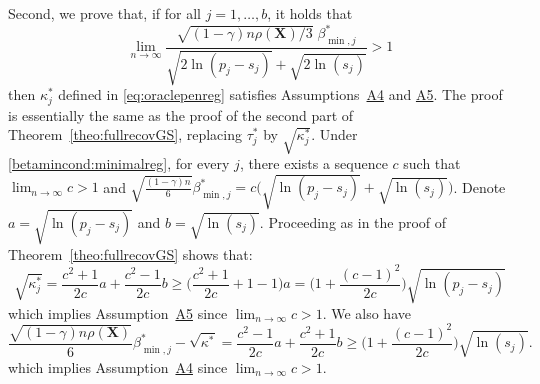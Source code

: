 \documentclass[
  12pt]{article}
\newcommand{\bX}{\mathbf{X}}
\begin{document}
Second, we prove that, if for all $j=1,\ldots,b$, it holds that
\begin{equation}\label{betamincond:minimalreg}
    \lim_{n\to \infty}\frac{\sqrt{(1-\gamma) n\rho(\bX)/3}\;\beta_{\min,j}^*}{\sqrt{2\ln(p_j-s_j)} + \sqrt{2\ln(s_j)}} >1
\end{equation}
then $\kappa^*_j$ defined in \eqref{eq:oraclepenreg} satisfies Assumptions~\hyperlink{lab:A4}{A4} and \hyperlink{lab:A5}{A5}. The proof is essentially the same as the proof of the second part of Theorem~\ref{theo:fullrecovGS}, replacing $\tau^*_j$ by $\sqrt{\kappa^*_j}$.  Under \eqref{betamincond:minimalreg}, for every $j$, there exists a sequence $c$ such that $\lim_{n\to\infty} c>1$ and $\sqrt{\frac{(1-\gamma)n}{6}}\beta^*_{\min,j}=c\big(\sqrt{\ln(p_j-s_j)} + \sqrt{\ln(s_j)}\big)$. Denote $a=\sqrt{\ln(p_j-s_j)}$ and $b=\sqrt{\ln(s_j)}$. Proceeding as in the proof of Theorem~\ref{theo:fullrecovGS} shows that:
\begin{equation*}
\sqrt{\kappa^*_j} =\frac{c^2+1}{2c}a+\frac{c^2-1}{2c}b  \geq  \Big(\frac{c^2+1}{2c}+1-1\Big)a = \Big(1+\frac{(c-1)^2}{2c}\Big)\sqrt{\ln(p_j-s_j)} 
\end{equation*}
which implies Assumption~\hyperlink{lab:A5}{A5} since $\lim_{n\to\infty} c>1$. We also have
\begin{equation*}
\frac{\sqrt{(1-\gamma) n\rho(\bX)}}{6}{\beta_{\min,j}^*}-\sqrt{\kappa^*} = \frac{c^2-1}{2c}a+\frac{c^2+1}{2c}b \geq \Big(1+\frac{(c-1)^2}{2c}\Big)\sqrt{\ln(s_j)}.
\end{equation*}
which implies Assumption~\hyperlink{lab:A4}{A4} since $\lim_{n\to\infty} c>1$.
\end{document}

